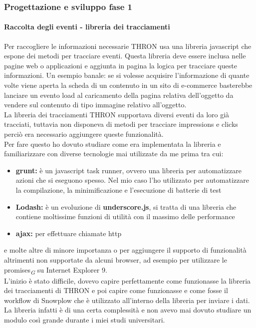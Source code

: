 \documentclass[a4paper, 12pt, twoside, openright]{book}
\newcommand{\gloss}[1]{#1\textsubscript{\textit{\tiny{G}}}}
\begin{document}
\subsubsection{Progettazione e sviluppo fase 1}

\paragraph{Raccolta degli eventi - libreria dei tracciamenti}
Per raccogliere le informazioni necessarie THRON usa una libreria javascript che espone dei metodi per tracciare eventi. Questa libreria deve essere inclusa nelle pagine web o applicazioni e aggiunta in pagina la logica per tracciare queste informazioni. Un esempio banale: se si volesse acquisire l'informazione di quante volte viene aperta la scheda di un contenuto in un sito di e-commerce basterebbe lanciare un evento load al caricamento della pagina relativa dell'oggetto da vendere sul contenuto di tipo immagine relativo all'oggetto.\\
La libreria dei tracciamenti THRON supportava diversi eventi da loro già tracciati, tuttavia non disponeva di metodi per tracciare impressions e clicks perciò era necessario aggiungere queste funzionalità.\\
Per fare questo ho dovuto studiare come era implementata la libreria e familiarizzare con diverse tecnologie mai utilizzate da me prima tra cui:
\begin{itemize}
\item \textbf{grunt:} è un javascript task runner, ovvero una libreria per automatizzare azioni che si eseguono spesso. Nel mio caso l'ho utilizzato per automatizzare la compilazione, la minimificazione e l'esecuzione di batterie di test
\item \textbf{Lodash:} è un evoluzione di \textbf{underscore.js}, si tratta di una libreria che contiene moltissime funzioni di utilità con il massimo delle performance
\item \textbf{ajax:} per effettuare chiamate http
\end{itemize}
e molte altre di minore importanza o per aggiungere il supporto di funzionalità altrimenti non supportate da alcuni browser, ad esempio per utilizzare le \gloss{promises} su Internet Explorer 9.\\
L'inizio è stato difficile, dovevo capire perfettamente come funzionasse la libreria dei tracciamenti di THRON e poi capire come funzionasse e come fosse il workflow di Snowplow che è utilizzato all'interno della libreria per inviare i dati. La libreria infatti è di una certa complessità e non avevo mai dovuto studiare un modulo così grande durante i miei studi universitari.\\
\end{document}
